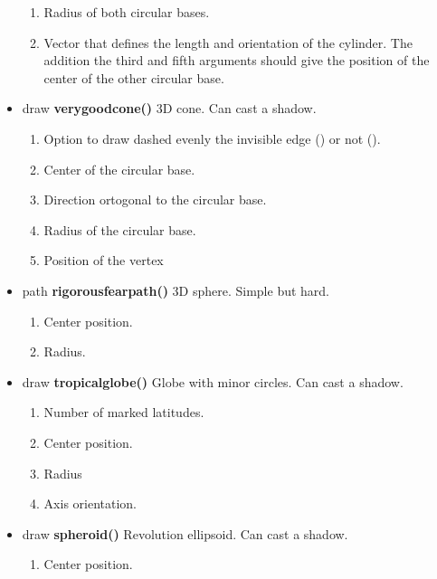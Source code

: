 \begin{itemize}
\begin{enumerate}
\item {} Radius of both circular bases.
\item {} Vector that defines the length and
orientation of the
cylinder. The addition the third and fifth
arguments should give the
position of the center of the other circular base.
\end{enumerate}
\item draw {\bfseries verygoodcone()} 3D cone. Can cast a shadow.
\begin{enumerate}
\item {} Option to draw dashed evenly
the invisible edge () or not
().
\item {} Center of the circular base.
\item {} Direction ortogonal to the
circular base.
\item {} Radius of the circular base.
\item {} Position of the vertex
\end{enumerate}
\item path {\bfseries rigorousfearpath()}
3D sphere. Simple but hard.
\begin{enumerate}
\item {} Center position.
\item {} Radius.
\end{enumerate}
\item draw {\bfseries tropicalglobe()} Globe with
minor circles. Can cast a shadow.
\begin{enumerate}
\item {} Number of marked latitudes.
\item {} Center position.
\item {} Radius
\item {} Axis orientation.
\end{enumerate}
\item draw {\bfseries spheroid()} Revolution ellipsoid. Can cast a shadow.
\begin{enumerate}
\item {} Center position.

\end{enumerate}
\end{itemize}
